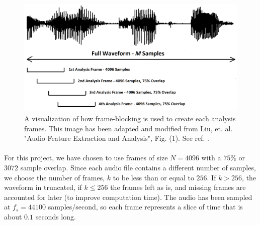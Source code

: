 \documentclass[12pt,letterpaper]{article}
\begin{document}
\begin{figure}[H]
\begin{center}
\includegraphics[scale=0.45]{../Figures/AnalysisFrames}
\end{center}
\caption{A visualization of how frame-blocking is used to create each analysis frames. This image has been adapted and modified from Liu, et. al. "Audio Feature Extraction and Analysis", Fig. (1). See ref. \cite{Liu}.}
\label{fig-AnalysisFrames}
\end{figure}

\paragraph*{}For this project, we have chosen to use frames of size $N = 4096$ with a $75\%$ or $3072$ sample overlap. Since each audio file contains a different number of samples, we choose the number of frames, $k$ to be less than or equal to $256$. If $k > 256$, the waveform in truncated, if $k \leq 256$ the frames left as is, and missing frames are accounted for later (to improve computation time). The audio has been sampled at $f_s = 44100$ samples/second, so each frame represents a slice of time that is about $0.1$ seconds long.
\end{document}
